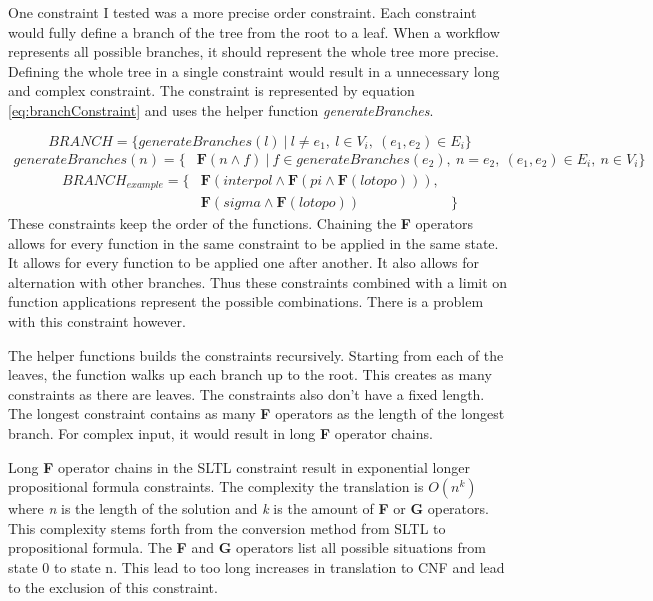 \documentclass{article}
\begin{document}
One constraint I tested was a more precise order constraint. Each constraint would fully define a branch of the tree from the root to a leaf. When a workflow represents all possible branches, it should represent the whole tree more precise. Defining the whole tree in a single constraint would result in a unnecessary long and complex constraint. The constraint is represented by equation \ref{eq:branchConstraint} and uses the helper function \textit{generateBranches}.

\begin{equation}
    BRANCH = \{ generateBranches(l)\ |\ l \not = e_1,\ l \in V_i,\ (e_1, e_2) \in E_i \} \label{eq:branchConstraint}
\end{equation}
\begin{align*}
    generateBranches(n) = \{
    &\textbf{F}(n \wedge f)\ |\ f \in generateBranches(e_2) ,\ n = e_2 ,\ (e_1,e_2) \in E_i,\ n \in V_i \}
\end{align*}
\begin{align*}
    BRANCH_{example}=\{& \textbf{F}(interpol \wedge \textbf{F}(pi \wedge \textbf{F}(lotopo))), \\
    &\textbf{F}(sigma \wedge \textbf{F}(lotopo))  &  \}
\end{align*}
% 
These constraints keep the order of the functions. Chaining the \textbf{F} operators allows for every function in the same constraint to be applied in the same state. It allows for every function to be applied one after another. It also allows for alternation with other branches. Thus these constraints combined with a limit on function applications represent the possible combinations. There is a problem with this constraint however.

The helper functions builds the constraints recursively. Starting from each of the leaves, the function walks up each branch up to the root. This creates as many constraints as there are leaves. The constraints also don't have a fixed length. The longest constraint contains as many \textbf{F} operators as the length of the longest branch. For complex input, it would result in long \textbf{F} operator chains. 

Long \textbf{F} operator chains in the SLTL constraint result in exponential longer propositional formula constraints. The complexity the translation is $O(n^k)$ where \textit{n} is the length of the solution and \textit{k} is the amount of \textbf{F} or \textbf{G} operators. This complexity stems forth from the conversion method from SLTL to propositional formula. The \textbf{F} and \textbf{G} operators list all possible situations from state 0 to state n. This lead to too long increases in translation to CNF and lead to the exclusion of this constraint. 
\\
\end{document}
